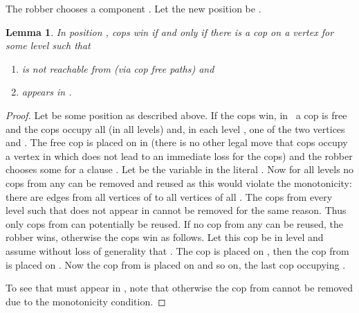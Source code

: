 \documentclass[authoryear]{article}
\newtheorem{lemma}[theorem]{Lemma}
\theoremstyle{definition}
\newcommand{\0}{\emptyset}
\begin{document}
The robber
chooses a component . Let the new position be .
\begin{lemma}\label{lemma:use_one_cop}
  In position ,  cops win if and only if there is a
  cop on a vertex  for some level  such that
  \begin{enumerate}
  \item  is not reachable from  (via cop free
    paths) and 
  \item  appears in .
  \end{enumerate}
\end{lemma}
\begin{proof}
  Let  be some position as described above. If the cops
  win, in~ a cop is free  and
  the cops occupy all  (in all levels) and, in each level
  , one of the two vertices  and . The
  free cop is placed on  in  (there is no other legal move
  that cops occupy a vertex in  which does not lead to an immediate loss for the cops)
  and the robber chooses some  for a clause
  . Let  be the variable in
  the literal . Now for all levels  no cops from any
   can be removed and reused as this would violate the
  monotonicity: there are edges from all vertices of  to all
  vertices of all . The cops from every level  such
  that  does not appear in  cannot be removed for
  the same reason. Thus only cops from  can
  potentially be reused. If no cop from any  can be reused,
  the robber wins, otherwise the cops win as follows. Let this cop be
  in level  and assume without loss of generality that
  . The cop is placed on , then the cop from
   is placed on . Now the cop from
   is placed on  and so on, the last cop
  occupying .

  To see that  must appear in , note that otherwise the cop
  from  cannot be removed due to the monotonicity condition.
\end{proof}
\end{document}
